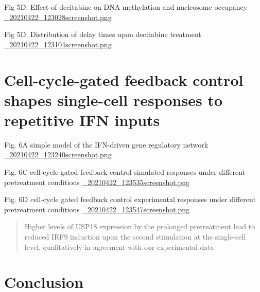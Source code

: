 \documentclass[bigger]{beamer}
\begin{document}
\begin{frame}[label={sec:org36d29a0}]{Fig 5D. Effect of decitabine on DNA methylation and nucleosome occupancy}
\url{\_20210422\_123028screenshot.png}
\end{frame}

\begin{frame}[label={sec:org5241cac}]{Fig 5D. Distribution of delay times upon decitabine treatment}
\url{\_20210422\_123104screenshot.png}
\end{frame}

\section{Cell-cycle-gated feedback control shapes single-cell responses to repetitive IFN inputs}
\label{sec:org906da3c}

\begin{frame}[label={sec:org81cb677}]{Fig. 6A simple model of the IFN-driven gene regulatory network}
\url{\_20210422\_123240screenshot.png}
\end{frame}

\begin{frame}[label={sec:orgc5cb797}]{Fig. 6C cell-cycle gated feedback control simulated responses under different pretreatment conditions}
\url{\_20210422\_123535screenshot.png}
\end{frame}

\begin{frame}[label={sec:org7ce52a5}]{Fig. 6D cell-cycle gated feedback control experimental responses under different pretreatment conditions}
\url{\_20210422\_123547screenshot.png}


\begin{quote}
Higher levels of USP18 expression by the prolonged pretreatment lead to reduced IRF9 induction upon the second stimulation at the single-cell level, qualitatively in agreement with our experimental data
\end{quote}
\end{frame}


\section{Conclusion}
\label{sec:orgd3dd864}
\end{document}
